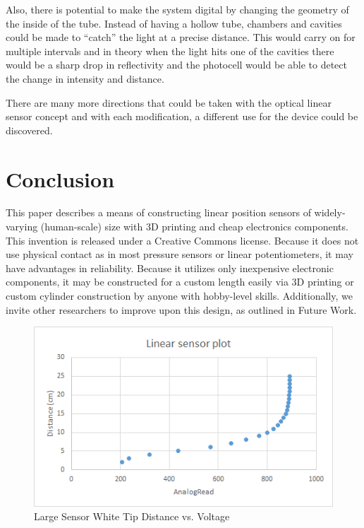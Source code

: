\documentclass[10pt,conference,compsocconf]{IEEEtran}
\begin{document}
Also, there is potential to make the system digital by changing the geometry of the inside of the tube. Instead of having a hollow tube, chambers and cavities could be made to “catch” the light at a precise distance. This would carry on for multiple intervals and in theory when the light hits one of the cavities there would be a sharp drop in reflectivity and the photocell would be able to detect the change in intensity and distance. 

There are many more directions that could be taken with the optical linear sensor concept and with each modification, a different use for the device could be discovered.


\section{Conclusion}

This paper describes a means of constructing linear position sensors of widely-varying (human-scale) size with 3D printing and cheap electronics components. This invention is released under a Creative Commons license. Because it does not use physical contact as in most pressure sensors or linear potentiometers, it may have advantages in reliability. Because it utilizes only inexpensive electronic components, it may be constructed for a custom length easily via 3D printing or custom cylinder construction by anyone with hobby-level skills. Additionally, we invite other researchers to improve upon this design, as outlined in Future Work.


\begin{figure}
  \centering
  \includegraphics[width=\textwidth]{figures/WhiteLargeDistanceVsRead.png}
  \caption{Large Sensor White Tip Distance vs. Voltage}  
\end{figure}
\end{document}

